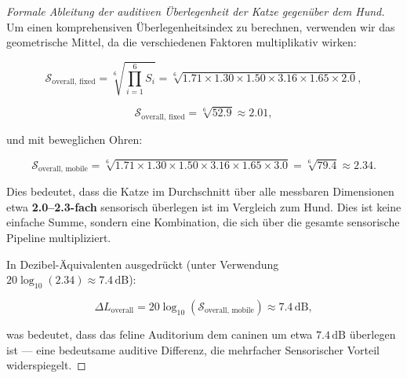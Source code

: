 ﻿\documentclass[12pt, a4paper]{article}
\theoremstyle{definition}
\theoremstyle{remark}
\begin{document}
\begin{proof}[Formale Ableitung der auditiven Überlegenheit der Katze gegenüber dem Hund]
Um einen komprehensiven Überlegenheitsindex zu berechnen, verwenden wir das geometrische Mittel, da die verschiedenen Faktoren multiplikativ wirken:

\begin{equation}
\mathcal{S}_{\text{overall, fixed}} = \sqrt[6]{\prod_{i=1}^{6} S_i} = \sqrt[6]{1.71 \times 1.30 \times 1.50 \times 3.16 \times 1.65 \times 2.0},
\label{eq:geometric_mean_fixed}
\end{equation}

\begin{equation}
\mathcal{S}_{\text{overall, fixed}} = \sqrt[6]{52.9} \approx 2.01,
\label{eq:overall_superiority_fixed}
\end{equation}

und mit beweglichen Ohren:

\begin{equation}
\mathcal{S}_{\text{overall, mobile}} = \sqrt[6]{1.71 \times 1.30 \times 1.50 \times 3.16 \times 1.65 \times 3.0} = \sqrt[6]{79.4} \approx 2.34.
\label{eq:overall_superiority_mobile}
\end{equation}

Dies bedeutet, dass die Katze im Durchschnitt über alle messbaren Dimensionen etwa \textbf{2.0--2.3-fach} sensorisch überlegen ist im Vergleich zum Hund. Dies ist keine einfache Summe, sondern eine Kombination, die sich über die gesamte sensorische Pipeline multipliziert.

In Dezibel-Äquivalenten ausgedrückt (unter Verwendung $20\log_{10}(2.34) \approx 7.4\,\mathrm{dB}$):

\begin{equation}
\Delta L_{\mathrm{overall}} = 20\log_{10}(\mathcal{S}_{\text{overall, mobile}}) \approx 7.4\,\mathrm{dB},
\label{eq:db_equivalent_superiority}
\end{equation}

was bedeutet, dass das feline Auditorium dem caninen um etwa $7.4\,\mathrm{dB}$ überlegen ist --- eine bedeutsame auditive Differenz, die mehrfacher Sensorischer Vorteil widerspiegelt.

\end{proof}
\end{document}
